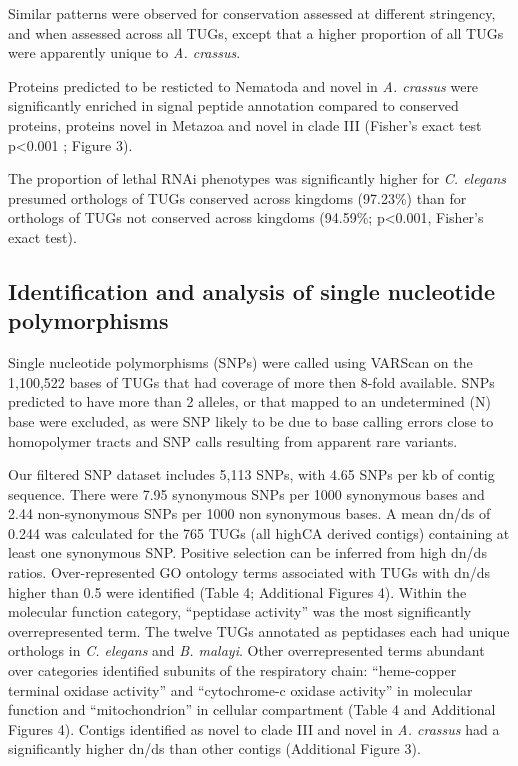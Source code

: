 \documentclass[10pt]{bmc_article}
\newenvironment{bmcformat}{\begin{raggedright}\baselineskip20pt\sloppy\setboolean{publ}{false}}{\end{raggedright}\baselineskip20pt\sloppy}
\begin{document}
\begin{bmcformat}
Similar patterns were observed for conservation assessed at different
stringency, and when assessed across all TUGs, except that a higher
proportion of all TUGs were apparently unique to \textit{A. crassus}.

Proteins predicted to be resticted to Nematoda and novel in
\textit{A. crassus} were significantly enriched in signal peptide
annotation compared to conserved proteins, proteins novel in Metazoa
and novel in clade III (Fisher's exact test p<0.001 ; Figure 3).

The proportion of lethal RNAi phenotypes was significantly higher for
\textit{C. elegans} presumed orthologs of TUGs conserved across
kingdoms (97.23\%) than for orthologs of TUGs not conserved across
kingdoms (94.59\%; p<0.001, Fisher's exact test).

\subsection*{Identification and analysis of single nucleotide
  polymorphisms}

Single nucleotide polymorphisms (SNPs) were called using VARScan
\cite{pmid19542151} on the 1,100,522 bases of TUGs that
had coverage of more then 8-fold available. SNPs predicted to have
more than 2 alleles, or that mapped to an undetermined (N) base were
excluded, as were SNP likely to be due to base calling errors close to
homopolymer tracts and SNP calls resulting from apparent rare
variants. 

Our filtered SNP dataset includes 5,113 SNPs, with 4.65 SNPs per kb of
contig sequence. There were 7.95 synonymous SNPs per 1000 synonymous
bases and 2.44 non-synonymous SNPs per 1000 non synonymous bases. A
mean dn/ds of 0.244 was calculated for the 765 TUGs (all highCA
derived contigs) containing at least one synonymous SNP. Positive
selection can be inferred from high dn/ds ratios. Over-represented GO
ontology terms associated with TUGs with dn/ds higher than 0.5 were
identified (Table 4; Additional Figures 4). Within the molecular
function category, ``peptidase activity'' was the most significantly
overrepresented term. The twelve TUGs annotated as peptidases each had
unique orthologs in \textit{C. elegans} and \textit{B. malayi}. Other
overrepresented terms abundant over categories identified subunits of
the respiratory chain: ``heme-copper terminal oxidase activity'' and
``cytochrome-c oxidase activity'' in molecular function and
``mitochondrion'' in cellular compartment (Table 4 and Additional
Figures 4). Contigs identified as novel to clade III and novel in
\textit{A. crassus} had a significantly higher dn/ds than other
contigs (Additional Figure 3).


\end{bmcformat}
\end{document}
